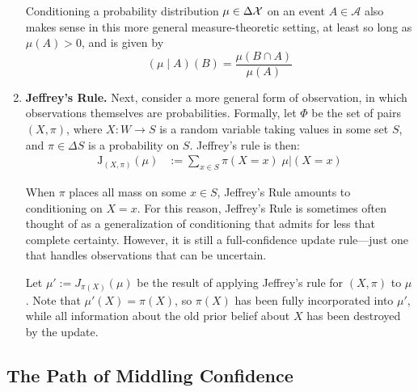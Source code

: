 \begin{enumerate}[wide, label=\textbf{\thesubsection.\arabic*}]
{	Conditioning a probability distribution $\mu \in \Delta\mathcal X$ on an event $A \in \mathcal A$ also makes sense in this more general measure-theoretic setting, at least so long as $\mu(A) > 0$, and is given by
	$$
		(\mu \mid A) (B) = \frac{\mu(B \cap A)}{\mu(A)}
	$$
	}


	\item
	\textbf{Jeffrey's Rule.}
	Next, consider a more general form of observation, in which observations themselves are probabilities.
	Formally, let $\Phi$ be the set of pairs $(X,\pi)$,
	where $X : W \to S$ is a random variable taking values in some set $S$,
	and $\pi \in \Delta S$ is a probability on
	$S$.
	Jeffrey's rule is then:
	\begin{align*}
		\mathrm{J}_{(X,\pi)}
		(\mu) &:= \sum_{x \in S} \pi(X{=}x) \;  \mu \big|
            (X{=}x)
	\end{align*}

	When $\pi$ places all mass on some $x \in S$, Jeffrey's Rule amounts to conditioning on $X {=} x$.
	For this reason, Jeffrey's Rule is sometimes often thought of as a generalization of conditioning that admits for less that complete certainty.
	However, it is still a full-confidence update rule---just one that handles observations that can be uncertain.

	Let $\mu' := J_{\pi(X)}(\mu)$ be the result of applying Jeffrey's rule for $(X,\pi)$ to $\mu$.
	Note that $\mu'(X) = \pi(X)$, so $\pi(X)$ has been fully incorporated into $\mu'$, while all information about the old prior belief about $X$ has been destroyed by the update.
\end{enumerate}


\subsection{%
 	The Path of Middling Confidence}

